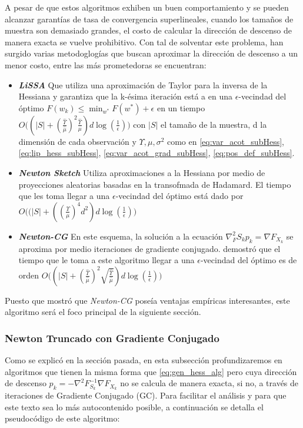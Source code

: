 \documentclass{book}
\theoremstyle{plain}
\theoremstyle{definition}
\theoremstyle{remark}
\begin{document}
A pesar de que estos algoritmos exhiben un buen comportamiento y se pueden alcanzar garantías de tasa de convergencia superlineales, cuando los tamaños de muestra son demasiado grandes, el costo de calcular la dirección de descenso de manera exacta se vuelve prohibitivo. Con tal de solventar este problema, han surgido varias metodoglogías que buscan aproximar la dirección de descenso a un menor costo, entre las más prometedoras se encuentran:
\begin{itemize}[topsep=0pt,partopsep=0ex,parsep=0ex]
\item\textbf{\emph{LiSSA}\cite{AGARWAL}} Que utiliza una aproximación de Taylor para la inversa de la Hessiana y garantiza que la k-ésima iteración está a en una $\epsilon$-vecindad del óptimo $F(w_k)\leq \displaystyle\min_{w^*} F(w^*) + \epsilon$  en  un tiempo $O\bigg((|S|+(\frac{\hat{\Upsilon}}{\hat{\mu}})^2\frac{\hat{\Upsilon}}{\mu})d\log(\frac{1}{\epsilon})\bigg)$ con $|S|$ el tamaño de la muestra, d la dimensión de cada observación y $\Upsilon,\mu,\sigma^2$ como en \ref{eq:var_acot_subHess}, \ref{eq:lip_hess_subHess}, \ref{eq:var_acot_grad_subHess}, \ref{eq:pos_def_subHess}.

\item\textbf{\emph{Newton Sketch}\cite{PILANCI}}  Utiliza aproximaciones a la Hessiana por medio de proyecciones aleatorias basadas en la transofmada de Hadamard. El tiempo que les toma llegar a una $\epsilon$-vecindad del óptimo está dado por $O\bigg((|S|+((\frac{\Upsilon}{\mu})^4d^2)d\log(\frac{1}{\epsilon})\bigg)$

\item \textbf{\emph{Newton-CG}\cite{BYRD}} En este esquema, la solución a la ecuación $\nabla^2_F{S_k}p_k=\nabla F_{X_k}$ se aproxima por medio iteraciones de gradiente conjugado\cite{NOCEDAL}. \cite{BOLLAPRAGADA} demostró que el tiempo que le toma a este algoritmo llegar a una $\epsilon$-vecindad del óptimo es de orden $O\bigg((|S|+(\frac{\hat{\Upsilon}}{\hat{\mu}})^2\sqrt{\frac{\hat{\Upsilon}}{\hat{\mu}}})d\log(\frac{1}{\epsilon})\bigg)$
\end{itemize}
Puesto que \cite{BOLLAPRAGADA} mostró que \emph{Newton-CG} poseía ventajas empíricas interesantes, este algoritmo será el foco principal de la siguiente sección.
\subsubsection{Newton Truncado con Gradiente Conjugado}
Como se explicó en la sección pasada, en esta subsección profundizaremos en algoritmos que tienen la misma forma que \ref{eq:gen_hess_alg} pero cuya dirección de descenso $p_k = -\nabla^2F_{S_k}^{-1}\nabla F_{X_k}$ no se calcula de manera exacta, si no, a través de iteraciones de Gradiente Conjugado (GC)\cite{NOCEDAL}. Para facilitar el análisis y para que este texto sea lo más autocontenido posible, a continuación se detalla el pseudocódigo de este algoritmo\cite{BYRD}:
\end{document}
